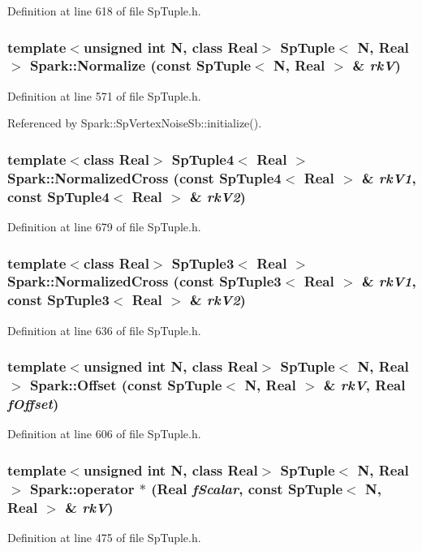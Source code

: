 Definition at line 618 of file Sp\-Tuple.h.
\subsubsection{\setlength{\rightskip}{0pt plus 5cm}template$<$unsigned int N, class Real$>$ Sp\-Tuple$<$ N, Real $>$ Spark::Normalize (const Sp\-Tuple$<$ N, Real $>$ \& {\em rk\-V})}\label{namespaceSpark_a122}


Definition at line 571 of file Sp\-Tuple.h.

Referenced by Spark::Sp\-Vertex\-Noise\-Sb::initialize().
\subsubsection{\setlength{\rightskip}{0pt plus 5cm}template$<$class Real$>$ Sp\-Tuple4$<$ Real $>$ Spark::Normalized\-Cross (const Sp\-Tuple4$<$ Real $>$ \& {\em rk\-V1}, const Sp\-Tuple4$<$ Real $>$ \& {\em rk\-V2})}\label{namespaceSpark_a129}


Definition at line 679 of file Sp\-Tuple.h.
\subsubsection{\setlength{\rightskip}{0pt plus 5cm}template$<$class Real$>$ Sp\-Tuple3$<$ Real $>$ Spark::Normalized\-Cross (const Sp\-Tuple3$<$ Real $>$ \& {\em rk\-V1}, const Sp\-Tuple3$<$ Real $>$ \& {\em rk\-V2})}\label{namespaceSpark_a126}


Definition at line 636 of file Sp\-Tuple.h.
\subsubsection{\setlength{\rightskip}{0pt plus 5cm}template$<$unsigned int N, class Real$>$ Sp\-Tuple$<$ N, Real $>$ Spark::Offset (const Sp\-Tuple$<$ N, Real $>$ \& {\em rk\-V}, Real {\em f\-Offset})}\label{namespaceSpark_a124}


Definition at line 606 of file Sp\-Tuple.h.
\subsubsection{\setlength{\rightskip}{0pt plus 5cm}template$<$unsigned int N, class Real$>$ Sp\-Tuple$<$ N, Real $>$ Spark::operator $\ast$ (Real {\em f\-Scalar}, const Sp\-Tuple$<$ N, Real $>$ \& {\em rk\-V})}\label{namespaceSpark_a118}


Definition at line 475 of file Sp\-Tuple.h.